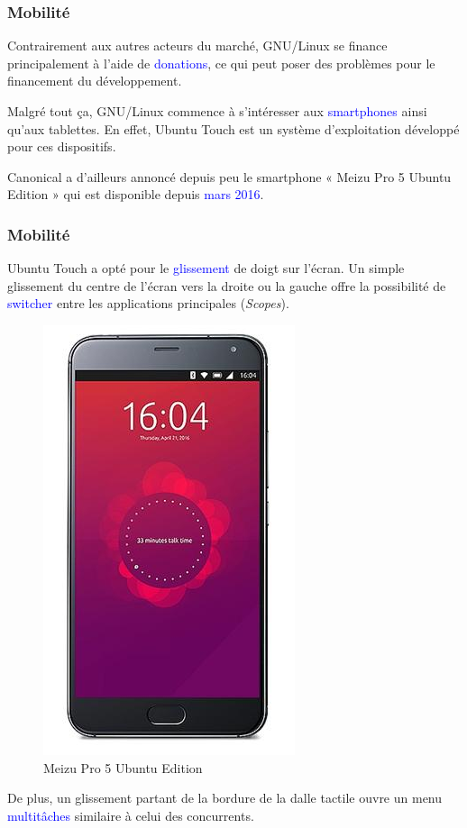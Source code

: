 \documentclass[aspectratio=169]{beamer}
\begin{document}
\begin{frame}
\frametitle{Mobilité}
Contrairement aux autres acteurs du marché, GNU/Linux se finance principalement
à l'aide de \textcolor{blue}{donations}, ce qui peut poser des problèmes pour
le financement du développement.

\hspace{0.5cm}

Malgré tout ça, GNU/Linux commence à s'intéresser aux \textcolor{blue}{smartphones}
ainsi qu'aux tablettes. En effet, Ubuntu Touch est un système d'exploitation
développé pour ces dispositifs.

\hspace{0.5cm}

Canonical a d'ailleurs annoncé depuis peu le smartphone « Meizu Pro 5 Ubuntu
Edition » qui est disponible depuis \textcolor{blue}{mars 2016}.
\end{frame}

\begin{frame}
  \frametitle{Mobilité}
Ubuntu Touch a opté pour le \textcolor{blue}{glissement} de doigt sur l'écran.
Un simple glissement du centre de l'écran vers la droite ou la gauche
offre la possibilité de \textcolor{blue}{switcher} entre les applications
principales (\textit{Scopes}).

  \begin{figure}[!h]
    \centering
    \includegraphics[scale=0.25]
    {textures/images/unix/mobiles/ubuntuTouch.png}
    \caption{Meizu Pro 5 Ubuntu Edition}
  \end{figure}
  \vspace{-3.5mm}

De plus, un glissement partant de la bordure de la dalle tactile ouvre un menu
\textcolor{blue}{multitâches} similaire à celui des concurrents.
\end{frame}
\end{document}
